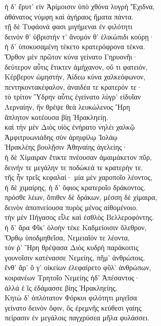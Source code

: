 \begin{pages}
\begin{Leftside}
\quad{}ἡ δ' ἔρυτ' εἰν Ἀρίμοισιν ὑπὸ χθόνα λυγρὴ Ἔχιδνα, \\
ἀθάνατος νύμφη καὶ ἀγήραος ἤματα πάντα. \\
τῇ δὲ Τυφάονά φασι μιγήμεναι ἐν φιλότητι\\
δεινόν θ' ὑβριστήν τ' ἄνομόν θ' ἑλικώπιδι κούρῃ· \\
ἡ δ' ὑποκυσαμένη τέκετο κρατερόφρονα τέκνα.\\
Ὄρθον μὲν πρῶτον κύνα γείνατο Γηρυονῆι· \\
δεύτερον αὖτις ἔτικτεν ἀμήχανον, οὔ τι φατειόν,  \\
Κέρβερον ὠμηστήν, Ἀίδεω κύνα χαλκεόφωνον,\\
πεντηκοντακέφαλον, ἀναιδέα τε κρατερόν τε· \\
τὸ τρίτον Ὕδρην αὖτις ἐγείνατο λύγρ' εἰδυῖαν \\
Λερναίην, ἣν θρέψε θεὰ λευκώλενος Ἥρη\\
ἄπλητον κοτέουσα βίῃ Ἡρακληείῃ. \\
καὶ τὴν μὲν Διὸς υἱὸς ἐνήρατο νηλέι χαλκῷ\\
Ἀμφιτρυωνιάδης σὺν ἀρηιφίλῳ Ἰολάῳ\\
Ἡρακλέης βουλῇσιν Ἀθηναίης ἀγελείης·\\
ἡ δὲ Χίμαιραν ἔτικτε πνέουσαν ἀμαιμάκετον πῦρ,\\
δεινήν τε μεγάλην τε ποδώκεά τε κρατερήν τε.  \\
τῆς ἦν τρεῖς κεφαλαί· μία μὲν χαροποῖο λέοντος,\\
ἡ δὲ χιμαίρης, ἡ δ' ὄφιος κρατεροῖο δράκοντος.\\
πρόσθε λέων, ὄπιθεν δὲ δράκων, μέσση δὲ χίμαιρα,\\
δεινὸν ἀποπνείουσα πυρὸς μένος αἰθομένοιο.\\
τὴν μὲν Πήγασος εἷλε καὶ ἐσθλὸς Βελλεροφόντης. \\
ἡ δ' ἄρα Φῖκ' ὀλοὴν τέκε Καδμείοισιν ὄλεθρον,\\
Ὄρθῳ ὑποδμηθεῖσα, Νεμειαῖόν τε λέοντα, \\
τόν ῥ' Ἥρη θρέψασα Διὸς κυδρὴ παράκοιτις\\
γουνοῖσιν κατένασσε Νεμείης, πῆμ' ἀνθρώποις.\\
ἔνθ' ἄρ' ὅ γ' οἰκείων ἐλεφαίρετο φῦλ' ἀνθρώπων, \\
κοιρανέων Τρητοῖο Νεμείης ἠδ' Ἀπέσαντος· \\
ἀλλά ἑ ἲς ἐδάμασσε βίης Ἡρακληείης.\\

\quad{}Κητὼ δ' ὁπλότατον Φόρκυι φιλότητι μιγεῖσα\\
γείνατο δεινὸν ὄφιν, ὃς ἐρεμνῆς κεύθεσι γαίης\\
πείρασιν ἐν μεγάλοις παγχρύσεα μῆλα φυλάσσει. \\[5pt]


\end{Leftside}
\end{pages}

